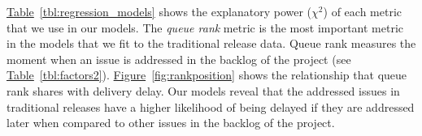 \begin{sloppypar}
\noindent\DIFdelbegin \textit{\textbf{}%
}%
\DIFdelend \DIFaddbegin {}
\DIFaddend \hyperref[tbl:regression_models]{Table}~\ref{tbl:regression_models} shows the
explanatory power ($\chi^2$) of each metric that we use in our models.  The
\textit{queue rank} metric is the most important metric in the models that we
fit to the traditional release data.  Queue rank measures the moment when an
issue is addressed in the backlog of the project (see
\hyperref[tbl:factors2]{Table}~\ref{tbl:factors2}).
\hyperref[fig:rankposition]{Figure}~\ref{fig:rankposition} shows the
relationship that queue rank shares with delivery delay. Our models reveal that
the addressed issues in traditional releases have a higher likelihood of being
delayed if they are addressed later when compared to other issues in the backlog
of the project.   

\begin{figure}[t]
	\centering


\end{figure}
\end{sloppypar}
